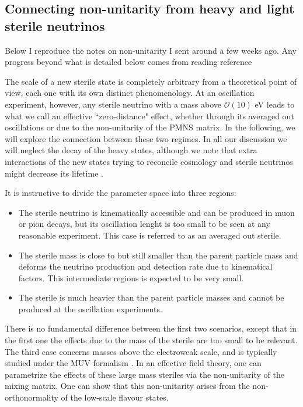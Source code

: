 \subsection{Connecting non-unitarity from heavy and light sterile neutrinos}
%
Below I reproduce the notes on non-unitarity I sent around a few weeks ago. Any progress beyond what is detailed below comes from reading reference \cite{Giunti1992}

The scale of a new sterile state is completely arbitrary from a theoretical point of view, each one with its own distinct phenomenology. At an oscillation experiment, however, any sterile neutrino with a mass above $\mathcal{O}(10)$ eV leads to what we call an effective ``zero-distance" effect, whether through its averaged out oscillations or due to the non-unitarity of the PMNS matrix. In the following, we will explore the connection between these two regimes. In all our discussion we will neglect the decay of the heavy states, although we note that extra interactions of the new states trying to reconcile cosmology and sterile neutrinos might decrease its lifetime \cite{Mirizzi2014,Chu2015,Archidiacono2014,Archidiacono2016}. 

It is instructive to divide the parameter space into three regions: 
\begin{itemize}
 \item The sterile neutrino is kinematically accessible and can be produced in muon or pion decays, but its oscillation lenght is too small to be seen at any reasonable experiment. This case is referred to as an averaged out sterile.
 \item The sterile mass is close to but still smaller than the parent particle mass and deforms the neutrino production and detection rate due to kinematical factors. This intermediate regions is expected to be very small.
 \item The sterile is much heavier than the parent particle masses and cannot be produced at the oscillation experiments.
\end{itemize}

There is no fundamental difference between the first two scenarios, except that in the first one the effects due to the mass of the sterile are too small to be relevant. The third case concerns masses above the electroweak scale, and is typically studied under the MUV formalism \cite{Antusch2006}. In an effective field theory, one can parametrize the effects of these large mass steriles via the non-unitarity of the mixing matrix. One can show that this non-unitarity arises from the non-orthonormality of the low-scale flavour states. 

